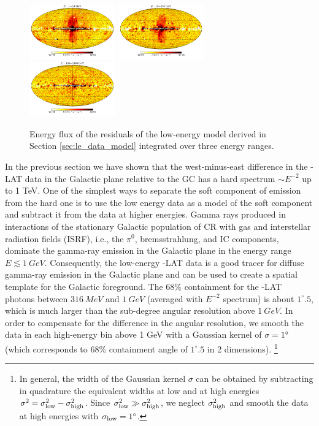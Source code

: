 \begin{figure}[t]
\includegraphics[width=0.33\textwidth]{plots/Mollweide_LowE_03-10GeV_flux_source_range_0.pdf}
\includegraphics[width=0.33\textwidth]{plots/Mollweide_LowE_03-10GeV_flux_source_range_1.pdf}
\includegraphics[width=0.33\textwidth]{plots/Mollweide_LowE_03-10GeV_flux_source_range_2.pdf}
\caption{Energy flux of the residuals of the low-energy model derived in Section \ref{sec:le_data_model}
integrated over three energy ranges. }
\label{fig:Maps_lowE}
\end{figure}


In the previous section we have shown that the west-minus-east difference in the \Fermi-LAT data in the Galactic plane relative to the GC has a hard 
spectrum $\sim E^{-2}$ up to 1 TeV.
One of the simplest ways to separate the soft component of emission from the hard one is to use the low energy data as
a model of the soft component and subtract it from the data at higher energies.
Gamma rays produced in interactions of the stationary Galactic population of CR with gas and interstellar radiation fields (ISRF),
i.e., the $\pi^0$, bremsstrahlung, and IC components,
dominate the gamma-ray emission in the Galactic plane in the energy range $E \lesssim \SI{1}{GeV}$. 
Consequently, the low-energy \Fermi-LAT data is a good tracer for diffuse gamma-ray emission in the Galactic plane and can be used to create a spatial template for the Galactic foreground.
The 68\% containment for the \Fermi-LAT photons between $\SI{316}{MeV}$ and $\SI{1}{GeV}$ (averaged with $E^{-2}$ spectrum) is about $1^\circ\!\!.5$,
which is much larger than the sub-degree angular resolution above $\SI{1}{GeV}$.
In order to compensate for the difference in the angular resolution, 
we smooth the data in each high-energy bin above 1 GeV
with a Gaussian kernel of $\sigma = \ang{1}$ (which corresponds to $68\%$ containment angle of
$1^\circ\!\!.5$ in 2 dimensions).%
\footnote{In general, the width of the Gaussian kernel $\sigma$ can be obtained by subtracting in quadrature
the equivalent widths at low and at high energies $\sigma^2 = \sigma_{\rm low}^2 - \sigma_{\rm high}^2$.
Since $\sigma_{\rm low}^2 \gg \sigma_{\rm high}^2$, we neglect $\sigma_{\rm high}^2$ and smooth the 
data at high energies with $\sigma_{\rm low} = 1^\circ$.}


